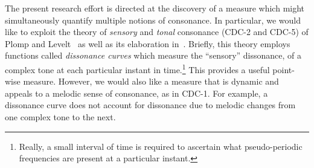 The present research effort is directed at the discovery of a
measure which might simultaneously quantify multiple notions of consonance.
In particular, we  would like to exploit the theory of \emph{sensory}
and \emph{tonal} consonance (CDC-2 and CDC-5)
of Plomp and Levelt~\citeyear{Plomp:1965} as well as its elaboration
in~.  
Briefly, this theory employs functions called
\emph{dissonance curves} which measure the ``sensory'' dissonance, of
a complex tone at each particular instant in time.\footnote{Really, a
small interval of time is required to ascertain what pseudo-periodic
frequencies are present at a particular instant.}   
This provides a useful point-wise measure.
However, we would also like a measure that is dynamic and appeals to a
melodic sense of consonance, as in CDC-1.  For example, a dissonance curve
does not account for dissonance due to melodic changes from one complex tone
to the next.  


